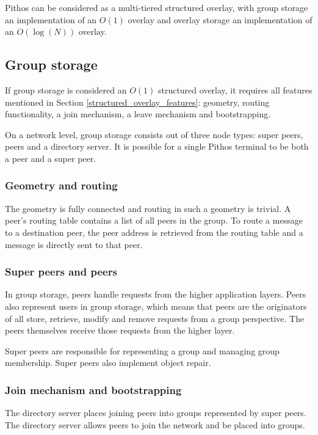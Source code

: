 Pithos can be considered as a multi-tiered structured overlay, with group storage an implementation of an $O(1)$ overlay and overlay storage an implementation of an $O(\log (N))$ overlay.

\subsection{Group storage}

If group storage is considered an $O(1)$ structured overlay, it requires all features mentioned in Section \ref{structured_overlay_features}: geometry, routing functionality, a join mechanism, a leave mechanism and bootstrapping.

On a network level, group storage consists out of three node types: super peers, peers and a directory server. It is possible for a single Pithos terminal to be both a peer and a super peer.

\subsubsection{Geometry and routing}

The geometry is fully connected and routing in such a geometry is trivial. A peer's routing table contains a list of all peers in the group. To route a message to a destination peer, the peer address is retrieved from the routing table and a message is directly sent to that peer.

\subsubsection{Super peers and peers}

In group storage, peers handle requests from the higher application layers. Peers also represent users in group storage, which means that peers are the originators of all store, retrieve, modify and remove requests from a group perspective. The peers themselves receive those requests from the higher layer.

Super peers are responsible for representing a group and managing group membership. Super peers also implement object repair.

\subsubsection{Join mechanism and bootstrapping}

The directory server places joining peers into groups represented by super peers. The directory server allows peers to join the network and be placed into groups.

